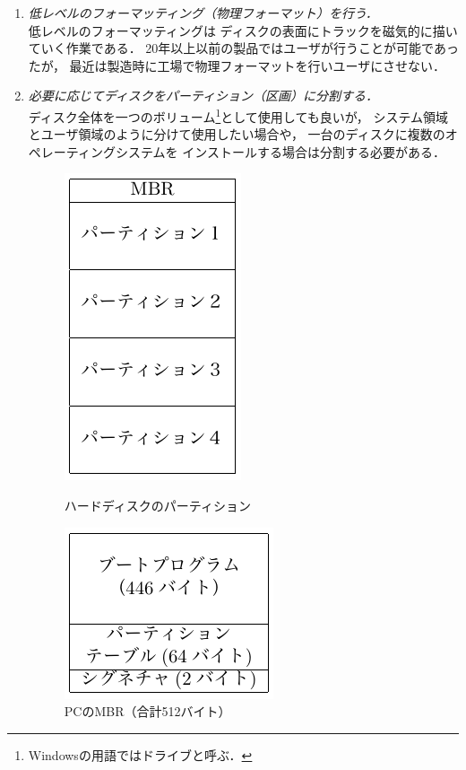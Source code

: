 \begin{enumerate}
\item \emph{低レベルのフォーマッティング（物理フォーマット）を行う．}\\
  低レベルのフォーマッティングは
  ディスクの表面にトラックを磁気的に描いていく作業である．
  20年以上以前の製品ではユーザが行うことが可能であったが，
  最近は製造時に工場で物理フォーマットを行いユーザにさせない．
\item \emph{必要に応じてディスクをパーティション（区画）に分割する．}\\
  ディスク全体を一つのボリューム\footnote{
    Windowsの用語ではドライブと呼ぶ．}として使用しても良いが，
  システム領域とユーザ領域のように分けて使用したい場合や，
  一台のディスクに複数のオペレーティングシステムを
  インストールする場合は分割する必要がある．

  \begin{figure}[btp]
    \begin{center}
      \begin{minipage}{0.49\columnwidth}
        \centerline{\includegraphics[scale=1.0]{Fig/hddPartition.pdf}}
        \caption{ハードディスクのパーティション}\label{fig:hddPartition}
      \end{minipage}
      \begin{minipage}{0.49\columnwidth}
        \centerline{\includegraphics[scale=1.0]{Fig/masterBootRecord.pdf}}
        \caption{PCのMBR（合計512バイト）}\label{fig:masterBootRecord}
      \end{minipage}
    \end{center}
  \end{figure}


\end{enumerate}
